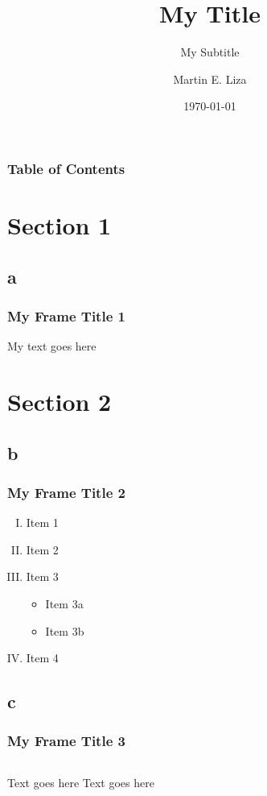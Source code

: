 \documentclass{beamer} %
\title{My Title}
\subtitle{My Subtitle}
\author{Martin E. Liza}
\institute{University of Arizona}
\date{\today}
\begin{document}
\begin{frame} 
	\titlepage 
\end{frame} 

\begin{frame}
	\frametitle{Table of Contents} 
	\tableofcontents
	\label{contents} 
\end{frame}


\section{Section 1}
\subsection{a}
\begin{frame}
\frametitle{My Frame Title 1} 
	My text goes here 
\end{frame}


\section{Section 2}
\subsection{b} 
\begin{frame}
\frametitle{My Frame Title 2}
	\begin{enumerate}[(I)]
	\item Item 1 
	\item Item 2
	\item Item 3
		\begin{itemize}
		\item Item 3a
		\item Item 3b
		\end{itemize} 	
	\item Item 4
	\end{enumerate}
\end{frame}

\subsection{c} 
\begin{frame}
\frametitle{My Frame Title 3} 
	\begin{columns}
	Text goes here
	Text goes here 
	\end{columns}	
\end{frame}
\end{document}
